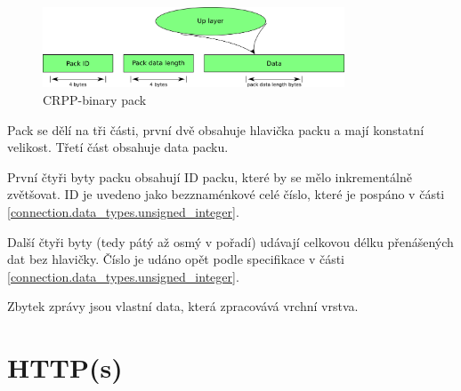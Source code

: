 \begin{figure}[h]
  \centering
  \includegraphics[width=0.80\textwidth]{diagrams/CRPP-binary.png}
  \caption{CRPP-binary pack}
  \label{down_layer.pictures.CRPP-binary}
\end{figure}

Pack se dělí na tři části, první dvě obsahuje hlavička packu a mají konstatní velikost. Třetí část obsahuje data packu. 

První čtyři byty packu obsahují ID packu, které by se mělo inkrementálně zvětšovat. ID je uvedeno jako bezznaménkové celé číslo, které je pospáno v části \ref{connection.data_types.unsigned_integer}.

Další čtyři byty (tedy pátý až osmý v pořadí) udávají celkovou délku přenášených dat bez hlavičky. Číslo je udáno opět podle specifikace v části \ref{connection.data_types.unsigned_integer}.

Zbytek zprávy jsou vlastní data, která zpracovává vrchní vrstva.

\chapter{HTTP(s)}
\label{down_layer.http}


